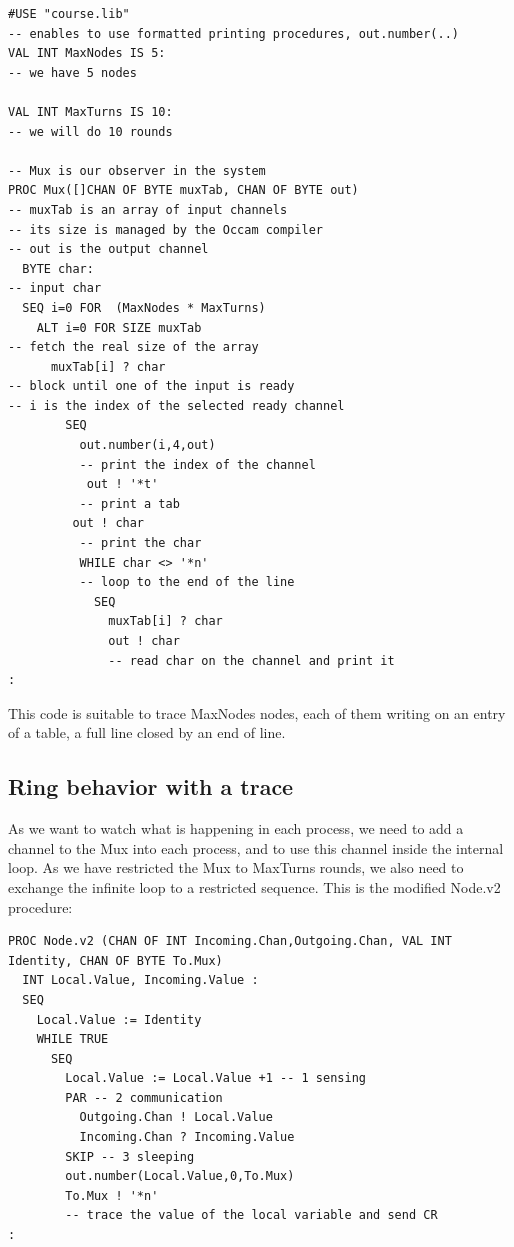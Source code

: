 \documentclass[times]{book}
\begin{document}
\begin{lstlisting} 
#USE "course.lib"
-- enables to use formatted printing procedures, out.number(..)
VAL INT MaxNodes IS 5:
-- we have 5 nodes

VAL INT MaxTurns IS 10:
-- we will do 10 rounds

-- Mux is our observer in the system 
PROC Mux([]CHAN OF BYTE muxTab, CHAN OF BYTE out)
-- muxTab is an array of input channels
-- its size is managed by the Occam compiler
-- out is the output channel
  BYTE char:  
-- input char
  SEQ i=0 FOR  (MaxNodes * MaxTurns)
    ALT i=0 FOR SIZE muxTab
-- fetch the real size of the array
      muxTab[i] ? char
-- block until one of the input is ready
-- i is the index of the selected ready channel
        SEQ 
          out.number(i,4,out)
          -- print the index of the channel  
           out ! '*t'
          -- print a tab
         out ! char
          -- print the char
          WHILE char <> '*n'
          -- loop to the end of the line
            SEQ
              muxTab[i] ? char
              out ! char
              -- read char on the channel and print it
:
\end{lstlisting} 

This code is suitable to trace MaxNodes nodes, each of them
writing on an entry of a table, a full line closed by an end of line.
 
\subsection {Ring behavior with a  trace }
\label{sec:ring5behav}
As we want to watch what is happening in each process, we need to
add a channel to the Mux into each process, and to use this
channel inside the internal loop. As we have restricted the Mux to MaxTurns
rounds, we also need to exchange the infinite loop to 
a restricted sequence. This is the modified Node.v2 procedure:


\begin{lstlisting}  
PROC Node.v2 (CHAN OF INT Incoming.Chan,Outgoing.Chan, VAL INT Identity, CHAN OF BYTE To.Mux)  
  INT Local.Value, Incoming.Value :
  SEQ
    Local.Value := Identity
    WHILE TRUE
      SEQ
        Local.Value := Local.Value +1 -- 1 sensing
        PAR -- 2 communication
          Outgoing.Chan ! Local.Value
          Incoming.Chan ? Incoming.Value
        SKIP -- 3 sleeping
        out.number(Local.Value,0,To.Mux)
        To.Mux ! '*n'
        -- trace the value of the local variable and send CR
:
\end{lstlisting} 
\end{document}

